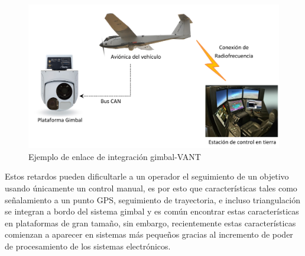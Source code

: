 \begin{figure}[H]
\centering \includegraphics[scale=0.5]{img/integration.pdf}
\caption{Ejemplo de enlace de integraci\'{o}n gimbal-VANT}%
\label{fig:Integration}
\end{figure}

Estos retardos pueden dificultarle a un operador el seguimiento de un objetivo usando \'{u}nicamente un control manual, es por esto que caracter\'{i}sticas tales como se\~{n}alamiento a un punto GPS, seguimiento de trayectoria, e incluso triangulaci\'{o}n se integran a bordo del sistema gimbal y es com\'{u}n encontrar estas caracter\'{i}sticas en plataformas de gran tama\~{n}o, sin embargo, recientemente estas caracter\'{i}sticas comienzan a aparecer en sistemas m\'{a}s peque\~{n}os gracias al incremento de poder de procesamiento de los sistemas electr\'{o}nicos.

